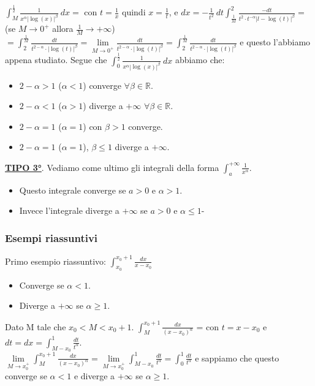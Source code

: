 $\int_M^{\frac{1}{2}}\frac{1}{x^{\alpha}|\log(x)|^{\beta}}\:dx =$ con $t=\frac{1}{x}$ quindi $x = \frac{1}{t}$, e $dx = -\frac{1}{t^2}\:dt \int_{\frac{1}{M}}^2 \frac{-dt}{t^2 \cdot t^{-\alpha} |l-\log(t)|^{\beta}} =$ (se $M\to 0^+$ allora $\frac{1}{M}\to +\infty$) $=\int_2^{\frac{1}{M}} \frac{dt}{t^{2-\alpha}\cdot|\log(t)|^{\beta}} = \lim\limits_{M\to 0^+}\frac{dt}{t^{2-\alpha}\cdot|\log(t)|^{\beta}} = \int_2^{\frac{1}{M}} \frac{dt}{t^{2-\alpha}\cdot|\log(t)|^{\beta}}$ e questo l'abbiamo appena studiato.
Segue che $\int_0^{\frac{1}{2}}\frac{1}{x^{\alpha}|\log(x)|^{\beta}}\:dx$ abbiamo che:
\begin{itemize}
    \item $2-\alpha > 1$ ($\alpha < 1$) converge $\forall \beta \in \mathbb{R}$.
    \item $2-\alpha < 1$ ($\alpha > 1$) diverge a $+\infty$ $\forall \beta \in \mathbb{R}$.
    \item $2-\alpha = 1$ ($\alpha = 1$) con $\beta > 1$ converge.
    \item $2-\alpha = 1$ ($\alpha = 1$), $\beta \leq 1$ diverge a $+\infty$.
\end{itemize}

\hspace{-15pt}\underline{\textbf{TIPO 3°}}. Vediamo come ultimo gli integrali della forma $\int_a^{+\infty} \frac{1}{x^{\alpha}}$.
\begin{itemize}
    \item Questo integrale converge se $a > 0$ e $\alpha > 1$.
    \item Invece l'integrale diverge a $+\infty$ se $a > 0$ e $\alpha \leq 1$-
\end{itemize}

\subsubsection{Esempi riassuntivi}
\begin{example}
Primo esempio riassuntivo: $\int_{x_0}^{x_0+1}\frac{dx}{x-x_0}$
\begin{itemize}
    \item Converge se $\alpha < 1$.
    \item Diverge a $+\infty$ se $\alpha \geq 1$.
\end{itemize}
Dato M tale che $x_0 < M < x_0 + 1$. $\int_M^{x_0+1}\frac{dx}{(x-x_0)^{\alpha}}$ = con $t = x - x_0$ e $dt = dx = \int_{M-x_0}^1 \frac{dt}{t^{\alpha}}$.\\
$\lim\limits_{M\to x_0^+}\int_M^{x_0+1}\frac{dx}{(x-x_0)^{\alpha}} = \lim\limits_{M\to x_0^+}\int_{M-x_0}^1 \frac{dt}{t^{\alpha}} = \int_0^1 \frac{dt}{t^{\alpha}}$ e sappiamo che questo converge se $\alpha < 1$ e diverge a $+\infty$ se $\alpha \geq 1$.
\end{example}

